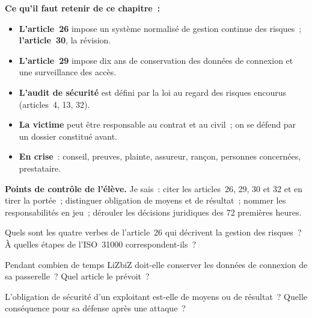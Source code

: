 \separateur

\begin{boxresume}
\textbf{Ce qu'il faut retenir de ce chapitre~:}
\begin{itemize}
    \item \textbf{L'article~26} impose un système normalisé de gestion
          continue des risques~; \textbf{l'article~30}, la révision.
    \item \textbf{L'article~29} impose dix ans de conservation des données
          de connexion et une surveillance des accès.
    \item \textbf{L'audit de sécurité} est défini par la loi au regard des
          risques encourus (articles~4, 13, 32).
    \item \textbf{La victime} peut être responsable au contrat et au civil~;
          on se défend par un dossier constitué avant.
    \item \textbf{En crise}~: conseil, preuves, plainte, assureur, rançon,
          personnes concernées, prestataire.
\end{itemize}
\end{boxresume}

\begin{boxinfo}
\textbf{Points de contrôle de l'élève.} Je sais~: citer les articles~26,
29, 30 et 32 et en tirer la portée~; distinguer obligation de moyens et
de résultat~; nommer les responsabilités en jeu~; dérouler les décisions
juridiques des 72 premières heures.
\end{boxinfo}

\bigskip

\begin{boxexo}[title={\ding{45}\quad Exercice~5.1. L'article 26 \niveaubase}]
Quels sont les quatre verbes de l'article~26 qui décrivent la gestion des
risques~? À quelles étapes de l'ISO~31000 correspondent-ils~?
\end{boxexo}

\begin{boxexo}[title={\ding{45}\quad Exercice~5.2. Dix ans \niveaubase}]
Pendant combien de temps LiZbiZ doit-elle conserver les données de
connexion de sa passerelle~? Quel article le prévoit~?
\end{boxexo}

\begin{boxexo}[title={\ding{45}\quad Exercice~5.3. Moyens ou résultat \niveaubase}]
L'obligation de sécurité d'un exploitant est-elle de moyens ou de
résultat~? Quelle conséquence pour sa défense après une attaque~?
\end{boxexo}

